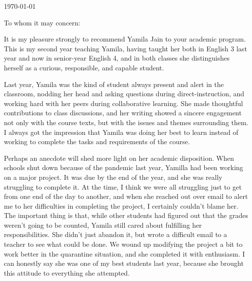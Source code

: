\documentclass[11pt, letterpaper]{letter} %
\begin{document}

\begin{letter}{
	\today\\	
}


\opening{To whom it may concern:}

It is my pleasure strongly to recommend Yamila Jain to your academic program. This is my second year teaching Yamila, having taught her both in English 3 last year and now in senior-year English 4, and in both classes she distinguishes herself as a curious, responsible, and capable student.

Last year, Yamila was the kind of student always present and alert in the classroom, nodding her head and asking questions during direct-instruction, and working hard with her peers during collaborative learning. She made thoughtful contributions to class discussions, and her writing showed a sincere engagement not only with the course texts, but with the issues and themes surrounding them. I always got the impression that Yamila was doing her best to learn instead of working to complete the tasks and requirements of the course.

Perhaps an anecdote will shed more light on her academic disposition. When schools shut down because of the pandemic last year, Yamilla had been working on a major project. It was due by the end of the year, and she was really struggling to complete it. At the time, I think we were all struggling just to get from one end of the day to another, and when she reached out over email to alert me to her difficulties in completing the project, I certainly couldn't blame her. The important thing is that, while other students had figured out that the grades weren't going to be counted, Yamila still cared about fulfilling her responsibilities. She didn't just abandon it, but wrote a difficult email to a teacher to see what could be done. We wound up modifying the project a bit to work better in the quarantine situation, and she completed it with enthusiasm. I can honestly say she was one of my best students last year, because she brought this attitude to everything she attempted.


\end{letter}
\end{document}
